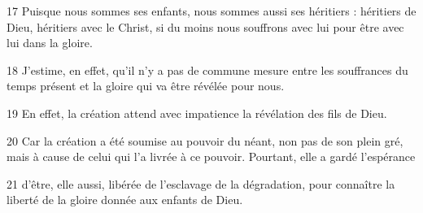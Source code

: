 
17 Puisque nous sommes ses enfants, nous sommes aussi ses héritiers : héritiers de Dieu, héritiers avec le Christ, si du moins nous souffrons avec lui pour être avec lui dans la gloire.

18 J’estime, en effet, qu’il n’y a pas de commune mesure entre les souffrances du temps présent et la gloire qui va être révélée pour nous.

19 En effet, la création attend avec impatience la révélation des fils de Dieu.

20 Car la création a été soumise au pouvoir du néant, non pas de son plein gré, mais à cause de celui qui l’a livrée à ce pouvoir. Pourtant, elle a gardé l’espérance

21 d’être, elle aussi, libérée de l’esclavage de la dégradation, pour connaître la liberté de la gloire donnée aux enfants de Dieu.
